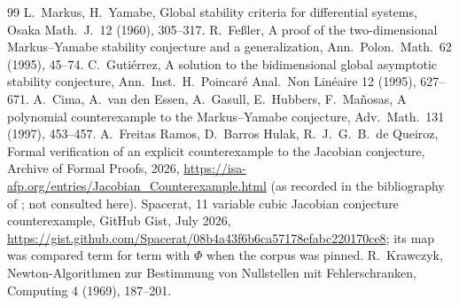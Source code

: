 \documentclass[11pt]{article}
\begin{document}
\begin{thebibliography}{99}
 L.~Markus, H.~Yamabe, Global stability criteria for differential systems, Osaka Math.\ J.\ 12 (1960), 305--317.
 R.~Fe\ss ler, A proof of the two-dimensional Markus--Yamabe stability conjecture and a generalization, Ann.\ Polon.\ Math.\ 62 (1995), 45--74.
 C.~Guti\'errez, A solution to the bidimensional global asymptotic stability conjecture, Ann.\ Inst.\ H.\ Poincar\'e Anal.\ Non Lin\'eaire 12 (1995), 627--671.
 A.~Cima, A.~van den Essen, A.~Gasull, E.~Hubbers, F.~Ma\~nosas, A polynomial counterexample to the Markus--Yamabe conjecture, Adv.\ Math.\ 131 (1997), 453--457.
 A.~Freitas Ramos, D.~Barros Hulak, R.~J.~G.~B.~de Queiroz, Formal verification of an explicit counterexample to the Jacobian conjecture, Archive of Formal Proofs, 2026, \url{https://isa-afp.org/entries/Jacobian_Counterexample.html} (as recorded in the bibliography of \cite{CHV2026}; not consulted here).
 Spacerat, 11 variable cubic Jacobian conjecture counterexample, GitHub Gist, July 2026, \url{https://gist.github.com/Spacerat/08b4a43f6b6ca57178efabc220170ce8}; its map was compared term for term with $\Phi$ when the corpus was pinned.
 R.~Krawczyk, Newton-Algorithmen zur Bestimmung von Nullstellen mit Fehlerschranken, Computing 4 (1969), 187--201.
\end{thebibliography}
\end{document}
